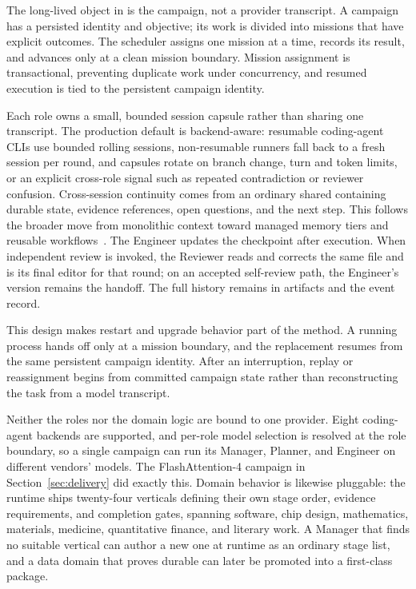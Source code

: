 The long-lived object in \systemname is the campaign, not a provider transcript. A
campaign has a persisted identity and objective; its work is divided into missions
that have explicit outcomes. The scheduler assigns one mission at a time, records
its result, and advances only at a clean mission boundary. Mission assignment is
transactional, preventing duplicate work under concurrency, and resumed execution
is tied to the persistent campaign identity.

Each role owns a small, bounded session capsule rather than sharing one transcript.
The production default is backend-aware: resumable coding-agent CLIs use bounded
rolling sessions, non-resumable runners fall back to a fresh session per round, and
capsules rotate on branch change, turn and token limits, or an explicit cross-role
signal such as repeated contradiction or reviewer confusion. Cross-session
continuity comes from an ordinary shared  containing durable
state, evidence references, open questions, and the next step. This follows the
broader move from monolithic context toward managed memory tiers and reusable
workflows~\citep{packer2023memgpt,wang2024workflowmemory,xu2025amem}. The Engineer
updates the checkpoint after execution. When independent review is invoked, the
Reviewer reads and corrects the same file and is its final editor for that round;
on an accepted self-review path, the Engineer's version remains the handoff. The
full history remains in artifacts and the event record.

This design makes restart and upgrade behavior part of the method. A running process
hands off only at a mission boundary, and the replacement resumes from the same
persistent campaign identity. After an interruption, replay or reassignment begins
from committed campaign state rather than reconstructing the task from a model
transcript.

Neither the roles nor the domain logic are bound to one provider. Eight coding-agent
backends are supported, and per-role model selection is resolved at the role
boundary, so a single campaign can run its Manager, Planner, and Engineer on
different vendors' models. The FlashAttention-4 campaign in
Section~\ref{sec:delivery} did exactly this. Domain behavior is likewise pluggable:
the runtime ships twenty-four verticals defining their own stage order, evidence
requirements, and completion gates, spanning software, chip design, mathematics,
materials, medicine, quantitative finance, and literary work. A Manager that finds no
suitable vertical can author a new one at runtime as an ordinary stage list, and a
data domain that proves durable can later be promoted into a first-class package.

